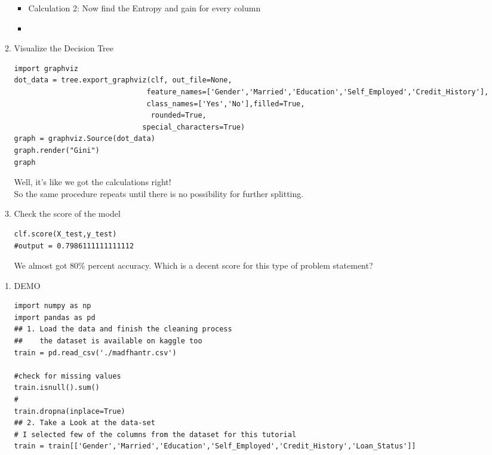 \documentclass[a4paper,12pt]{article}
\begin{document}
\begin{enumerate}
\begin{enumerate}
\begin{itemize}
\item Calculation 2: Now find the Entropy and gain for every column\\

\item 
\end{itemize}
\item Visualize the Decision Tree\\
\lstset{breaklines=true,language=Python,label= ,caption= ,captionpos=b,firstnumber=1,numbers=left}
\begin{lstlisting}
import graphviz
dot_data = tree.export_graphviz(clf, out_file=None,
                               feature_names=['Gender','Married','Education','Self_Employed','Credit_History'],
                               class_names=['Yes','No'],filled=True,
                                rounded=True,
                              special_characters=True)
graph = graphviz.Source(dot_data)
graph.render("Gini")
graph
\end{lstlisting}

Well, it’s like we got the calculations right!\\

So the same procedure repeats until there is no possibility for further splitting.\\
\item Check the score of the model\\
\lstset{breaklines=true,language=Python,label= ,caption= ,captionpos=b,firstnumber=1,numbers=left}
\begin{lstlisting}
clf.score(X_test,y_test)
#output = 0.7986111111111112
\end{lstlisting}

We almost got 80\% percent accuracy. Which is a decent score for this type of problem statement?\\
\end{enumerate}
\begin{enumerate}
\item DEMO
\label{sec:org98e2716}
\lstset{breaklines=true,language=Python,label= ,caption= ,captionpos=b,firstnumber=1,numbers=left}
\begin{lstlisting}
import numpy as np
import pandas as pd
## 1. Load the data and finish the cleaning process
##    the dataset is available on kaggle too
train = pd.read_csv('./madfhantr.csv')

#check for missing values
train.isnull().sum()
#
train.dropna(inplace=True)
## 2. Take a Look at the data-set
# I selected few of the columns from the dataset for this tutorial
train = train[['Gender','Married','Education','Self_Employed','Credit_History','Loan_Status']]


\end{lstlisting}
\end{enumerate}
\end{enumerate}
\end{document}
